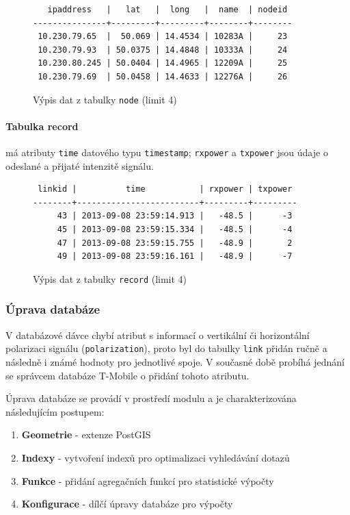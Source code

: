 \documentclass[a4paper,12pt,oneside]{report}
\begin{document}
\begin{figure}[h!]
\centering
\footnotesize
\begin{BVerbatim}
   ipaddress   |   lat   |  long   |  name  | nodeid 
---------------+---------+---------+--------+--------
 10.230.79.65  |  50.069 | 14.4534 | 10283A |     23
 10.230.79.93  | 50.0375 | 14.4848 | 10333A |     24
 10.230.80.245 | 50.0404 | 14.4965 | 12209A |     25
 10.230.79.69  | 50.0458 | 14.4633 | 12276A |     26
\end{BVerbatim}
\caption{Výpis dat z tabulky  \texttt{node} (limit 4)}
\end{figure}

\paragraph*{Tabulka record} má atributy \texttt{time} datového typu
\texttt{timestamp}; \texttt{rxpower} a \texttt{txpower} jsou údaje o
odeslané a přijaté intenzitě signálu.

\begin{figure}[h!]
\centering
\footnotesize
\begin{BVerbatim}
 linkid |          time           | rxpower | txpower 
--------+-------------------------+---------+---------
     43 | 2013-09-08 23:59:14.913 |   -48.5 |      -3
     45 | 2013-09-08 23:59:15.334 |   -48.5 |      -4
     47 | 2013-09-08 23:59:15.755 |   -48.9 |       2
     49 | 2013-09-08 23:59:16.161 |   -48.9 |      -7
\end{BVerbatim}
\caption{Výpis dat z tabulky \texttt{record} (limit 4) }
\end{figure}


\subsubsection*{Úprava databáze}
\label{subsubsec:upravadatabaze}  
V databázové dávce chybí atribut s informací o vertikální či
horizontální polarizaci signálu (\texttt{polarization}), proto byl do
tabulky \texttt{link} přidán ručně a následně i známé hodnoty pro
jednotlivé spoje. V současné době probíhá jednání se správcem databáze
T-Mobile o přidání tohoto atributu.
 
Úprava databáze se provádí v prostředí modulu a je charakterizována následujícím postupem:
\begin{enumerate}
\item \textbf{Geometrie} - extenze PostGIS
\item \textbf{Indexy} - vytvoření indexů pro optimalizaci vyhledávání dotazů
\item \textbf{Funkce} - přidání agregačních funkcí pro statistické výpočty
\item \textbf{Konfigurace} - dílčí úpravy databáze pro výpočty
\end{enumerate}
\end{document}
